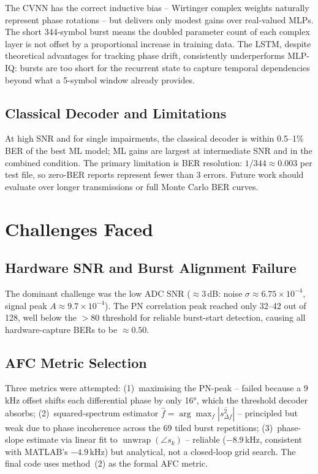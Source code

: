 \documentclass[journal]{IEEEtran}
\begin{document}
The CVNN has the correct inductive bias -- Wirtinger complex weights naturally
represent phase rotations -- but delivers only modest gains over real-valued MLPs.
The short 344-symbol burst means the doubled parameter count of each complex layer
is not offset by a proportional increase in training data.  The LSTM, despite
theoretical advantages for tracking phase drift, consistently underperforms MLP-IQ:
bursts are too short for the recurrent state to capture temporal dependencies beyond
what a 5-symbol window already provides.

\subsection{Classical Decoder and Limitations}

At high SNR and for single impairments, the classical decoder is within 0.5--1\%
BER of the best ML model; ML gains are largest at intermediate SNR and in the
combined condition.  The primary limitation is BER resolution: $1/344 \approx 0.003$
per test file, so zero-BER reports represent fewer than 3 errors.  Future work
should evaluate over longer transmissions or full Monte Carlo BER curves.

\section{Challenges Faced}
\label{sec:challenges}

\subsection{Hardware SNR and Burst Alignment Failure}

The dominant challenge was the low ADC SNR ($\approx 3$\,dB: noise
$\sigma \approx 6.75\times10^{-4}$, signal peak $A \approx 9.7\times10^{-4}$).
The PN correlation peak reached only 32--42 out of 128, well below the $>80$
threshold for reliable burst-start detection, causing all hardware-capture BERs
to be $\approx 0.50$.

\subsection{AFC Metric Selection}

Three metrics were attempted: (1)~maximising the PN-peak -- failed because a
9\,kHz offset shifts each differential phase by only 16°, which the threshold
decoder absorbs; (2)~squared-spectrum estimator
$\hat{f} = \arg\max_f|\overline{s_{\Delta f}^2}|$ -- principled but weak due
to phase incoherence across the 69 tiled burst repetitions; (3)~phase-slope
estimate via linear fit to $\operatorname{unwrap}(\angle s_k)$ -- reliable
($-8.9$\,kHz, consistent with MATLAB's $-4.9$\,kHz) but analytical, not a
closed-loop grid search.  The final code uses method~(2) as the formal AFC
metric.
\end{document}
